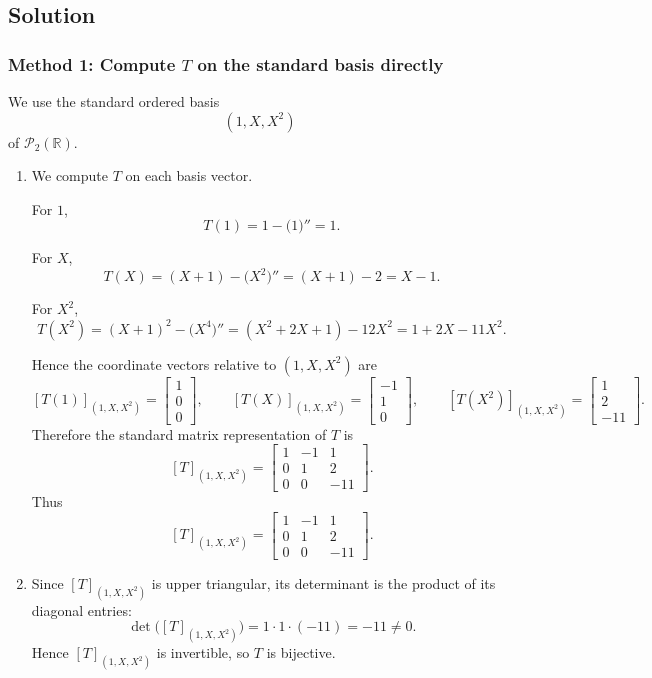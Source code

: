 \documentclass[12pt]{article}
\newcommand{\R}{\mathbb{R}}
\newcommand{\cP}{\mathcal{P}}
\begin{document}
\subsection{Solution}

\subsubsection{Method 1: Compute \(T\) on the standard basis directly}
We use the standard ordered basis
\[
(1,X,X^2)
\]
of \(\cP_2(\R)\).

\begin{enumerate}[label=(\alph*)]
\item We compute \(T\) on each basis vector.

For \(1\),
\[
T(1)=1-\bigl(1\bigr)''=1.
\]

For \(X\),
\[
T(X)=(X+1)-\bigl(X^2\bigr)''
=(X+1)-2
=X-1.
\]

For \(X^2\),
\[
T(X^2)=(X+1)^2-\bigl(X^4\bigr)''
=(X^2+2X+1)-12X^2
=1+2X-11X^2.
\]

Hence the coordinate vectors relative to \((1,X,X^2)\) are
\[
[T(1)]_{(1,X,X^2)}=
\begin{bmatrix}1\\0\\0\end{bmatrix},\qquad
[T(X)]_{(1,X,X^2)}=
\begin{bmatrix}-1\\1\\0\end{bmatrix},\qquad
[T(X^2)]_{(1,X,X^2)}=
\begin{bmatrix}1\\2\\-11\end{bmatrix}.
\]
Therefore the standard matrix representation of \(T\) is
\[
[T]_{(1,X,X^2)}
=
\begin{bmatrix}
1 & -1 & 1\\
0 &  1 & 2\\
0 &  0 & -11
\end{bmatrix}.
\]
Thus
\[
\boxed{
[T]_{(1,X,X^2)}
=
\begin{bmatrix}
1 & -1 & 1\\
0 &  1 & 2\\
0 &  0 & -11
\end{bmatrix}.}
\]

\item Since \([T]_{(1,X,X^2)}\) is upper triangular, its determinant is the product of its diagonal entries:
\[
\det\bigl([T]_{(1,X,X^2)}\bigr)=1\cdot 1\cdot (-11)=-11\neq 0.
\]
Hence \([T]_{(1,X,X^2)}\) is invertible, so \(T\) is bijective.


\end{enumerate}
\end{document}
